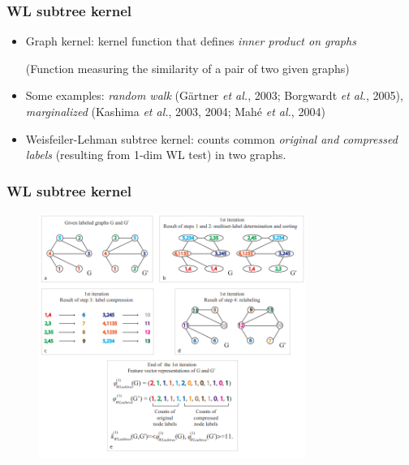 \documentclass[handout]{beamer}
\begin{document}
\begin{frame}
\frametitle{WL subtree kernel}

\begin{itemize}
	\item \alert{Graph kernel}: kernel function that defines {\it inner product on graphs} 
	
(Function measuring the similarity of a pair of two given graphs) \pause

	\item Some examples: {\it random walk} (G\"artner {\it et al.}, 2003; Borgwardt {\it et al.}, 2005), {\it marginalized} (Kashima {\it et al.}, 2003, 2004; Mah\'e {\it et al.}, 2004) \pause
	
	\item \alert{Weisfeiler-Lehman subtree kernel}: counts common {\it original and compressed labels} (resulting from 1-dim WL test) in two graphs.
\end{itemize}

\end{frame}

\begin{frame}
\frametitle{WL subtree kernel}

\begin{figure}[hbt]
	\includegraphics[height=8cm]{fig1.png}
\end{figure}

\end{frame}
\end{document}
